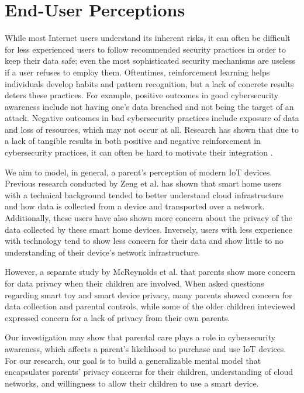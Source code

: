 \documentclass[12pt]{ucthesis}
\begin{document}
\section{End-User Perceptions}
While most Internet users understand its inherent risks, it can often be difficult for less experienced users to follow recommended security practices in order to keep their data safe; even the most sophisticated security mechanisms are useless if a user refuses to employ them. Oftentimes, reinforcement learning helps individuals develop habits and pattern recognition, but a lack of concrete results deters these practices. For example, positive outcomes in good cybersecurity awareness include not having one's data breached and not being the target of an attack. Negative outcomes in bad cybersecurity practices include exposure of data and loss of resources, which may not occur at all. Research has shown that due to a lack of tangible results in both positive and negative reinforcement in cybersecurity practices, it can often be hard to motivate their integration \cite{west:psychology}.

We aim to model, in general, a parent's perception of modern IoT devices. Previous research conducted by Zeng et al. \cite{zeng:enduser} has shown that smart home users with a technical background tended to better understand cloud infrastructure and how data is collected from a device and transported over a network. Additionally, these users have also shown more concern about the privacy of the data collected by these smart home devices. Inversely, users with less experience with technology tend to show less concern for their data and show little to no understanding of their device's network infrastructure. 

However, a separate study by McReynolds et al. \cite{mcreynolds:toysthatlisten} that parents show more concern for data privacy when their children are involved. When asked questions regarding smart toy and smart device privacy, many parents showed concern for data collection and parental controls, while some of the older children inteviewed expressed concern for a lack of privacy from their own parents.

Our investigation may show that parental care plays a role in cybersecurity awareness, which affects a parent's likelihood to purchase and use IoT devices. For our research, our goal is to build a generalizable mental model that encapsulates parents' privacy concerns for their children, understanding of cloud networks, and willingness to allow their children to use a smart device. 
\end{document}
